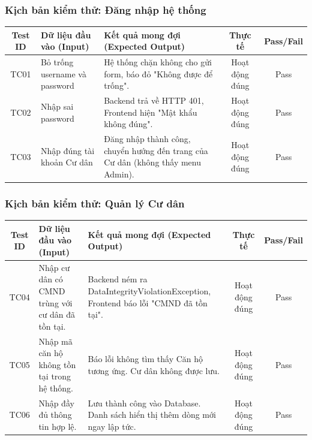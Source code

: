 \documentclass[12pt,a4paper]{article}
\begin{document}
\subsubsection{Kịch bản kiểm thử: Đăng nhập hệ thống}
\begin{table}[H]
    \centering
    \begin{tabularx}{\textwidth}{|c|L{4cm}|X|c|c|}
    \hline
    \textbf{Test ID} & \textbf{Dữ liệu đầu vào (Input)} & \textbf{Kết quả mong đợi (Expected Output)} & \textbf{Thực tế} & \textbf{Pass/Fail} \\
    \hline
    TC01 & Bỏ trống username và password & Hệ thống chặn không cho gửi form, báo đỏ "Không được để trống". & Hoạt động đúng & Pass \\
    \hline
    TC02 & Nhập sai password & Backend trả về HTTP 401, Frontend hiện "Mật khẩu không đúng". & Hoạt động đúng & Pass \\
    \hline
    TC03 & Nhập đúng tài khoản Cư dân & Đăng nhập thành công, chuyển hướng đến trang của Cư dân (không thấy menu Admin). & Hoạt động đúng & Pass \\
    \hline
    \end{tabularx}
\end{table}

\subsubsection{Kịch bản kiểm thử: Quản lý Cư dân}
\begin{table}[H]
    \centering
    \begin{tabularx}{\textwidth}{|c|L{4cm}|X|c|c|}
    \hline
    \textbf{Test ID} & \textbf{Dữ liệu đầu vào (Input)} & \textbf{Kết quả mong đợi (Expected Output)} & \textbf{Thực tế} & \textbf{Pass/Fail} \\
    \hline
    TC04 & Nhập cư dân có CMND trùng với cư dân đã tồn tại. & Backend ném ra DataIntegrityViolationException, Frontend báo lỗi "CMND đã tồn tại". & Hoạt động đúng & Pass \\
    \hline
    TC05 & Nhập mã căn hộ không tồn tại trong hệ thống. & Báo lỗi không tìm thấy Căn hộ tương ứng. Cư dân không được lưu. & Hoạt động đúng & Pass \\
    \hline
    TC06 & Nhập đầy đủ thông tin hợp lệ. & Lưu thành công vào Database. Danh sách hiển thị thêm dòng mới ngay lập tức. & Hoạt động đúng & Pass \\
    \hline
    \end{tabularx}
\end{table}
\end{document}

